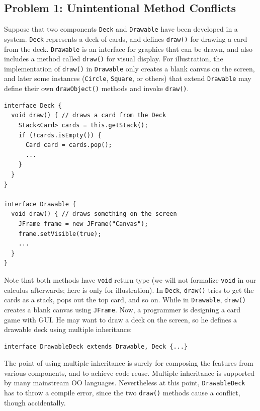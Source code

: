 \subsection{Problem 1: Unintentional Method Conflicts}
Suppose that two components \lstinline|Deck| and \lstinline|Drawable| 
have been developed in a system.  \lstinline|Deck| represents a deck
of cards, and defines \lstinline|draw()| for drawing a card from the
deck.  \lstinline|Drawable| is an interface for graphics that
can be drawn, and also includes a method called \lstinline|draw()| for
visual display. For illustration, the implementation of
\lstinline|draw()| in \lstinline|Drawable| only creates a blank canvas
on the screen, and later some instances (\lstinline|Circle|,
\lstinline|Square|, or others) that extend \lstinline|Drawable| may
define their own \lstinline|drawObject()| methods and invoke
\lstinline|draw()|.

\vspace{3pt}\begin{lstlisting}
interface Deck {
  void draw() { // draws a card from the Deck
    Stack<Card> cards = this.getStack();
    if (!cards.isEmpty()) {
      Card card = cards.pop();
      ...
    }
  }
}

interface Drawable {
  void draw() { // draws something on the screen
    JFrame frame = new JFrame("Canvas");
    frame.setVisible(true);
    ...
  }
}
\end{lstlisting}\vspace{3pt}
Note that both methods have \lstinline|void| return type (we will not formalize
\lstinline|void| in our calculus afterwards; here is only for illustration). In \lstinline|Deck|, \lstinline|draw()| tries to get the cards as a stack, pops
out the top card, and so on. While in \lstinline|Drawable|, \lstinline|draw()|
creates a blank canvas using \lstinline|JFrame|. Now, a programmer is designing a
card game with GUI. He may want to draw a deck on the screen, so he defines a drawable
deck using multiple inheritance:

\vspace{3pt}\begin{lstlisting}
interface DrawableDeck extends Drawable, Deck {...} 
\end{lstlisting}\vspace{3pt}
The point of using multiple inheritance is surely for composing the features from various 
components, and to achieve code reuse. Multiple inheritance is supported by many mainstream OO
languages. Nevertheless at this point, \lstinline|DrawableDeck| has to throw a compile
error, since the two \lstinline|draw()| methods cause a conflict, though accidentally.

